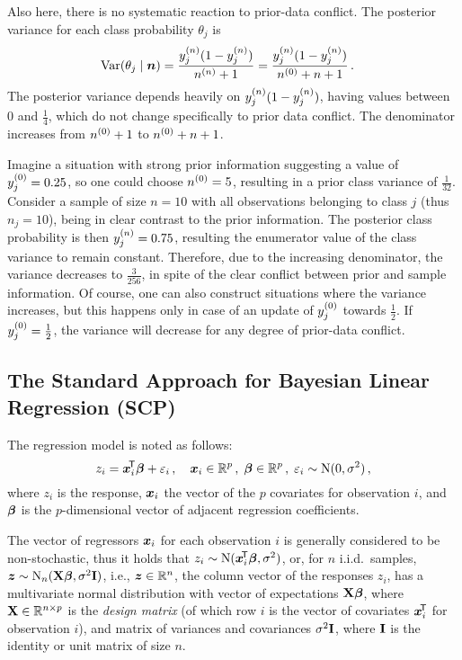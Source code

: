 Also here, there is no systematic reaction to prior-data conflict. The posterior
variance for each class probability $\theta_j$ is %
\begin{align*}
\operatorname{Var}(\theta_j\mid {\bm n}) &= \frac{y^{(n)}_j (1 - y^{(n)}_j)}{n^{(n)}+1}
                          = \frac{y^{(n)}_j (1 - y^{(n)}_j)}{n^{(0)}+n+1}\,.
\end{align*}
The posterior variance depends heavily on $y^{(n)}_j (1 - y^{(n)}_j)$,
having values between $0$ and $\frac{1}{4}$, which do not change
specifically to prior data conflict. The denominator increases from
$n^{(0)}+1$ to $n^{(0)}+n+1$.

Imagine a situation with strong prior information suggesting a value of $y^{(0)}_j = 0.25$,
so one could choose $n^{(0)} = 5$, resulting in a prior class variance of $\frac{1}{32}$.
Consider a sample of size $n=10$ with all observations belonging to class $j$ (thus $n_j=10$),
being in clear contrast to the prior information. The posterior class probability
is then $y^{(n)}_j = 0.75$, resulting the enumerator value of the class variance to remain constant.
Therefore, due to the increasing denominator, the variance decreases to $\frac{3}{256}$,
in spite of the clear conflict between prior and sample information.
Of course, one can also construct situations where the variance increases, but this
happens only in case of an update of $y^{(0)}_j$ towards $\frac{1}{2}$.
If $y^{(0)}_j = \frac{1}{2}$, the variance will decrease for any degree of prior-data conflict.


\subsection{The Standard Approach for Bayesian Linear Regression (SCP)}
\label{sec:scp}

The regression model is noted as follows:
\begin{equation*}
z_i = {\bm x}_i^{{\mbox{\!\scriptsize\textsf{T}}}}\boldsymbol{\beta} + \varepsilon_i \,,\quad {\bm x}_i \in \mathbb{R}^{p} \,,\;
\boldsymbol{\beta} \in \mathbb{R}^p \,,\; \varepsilon_i \sim \operatorname{N}(0,\sigma^2)\,,
\end{equation*}
where $z_i$ is the response, ${\bm x}_i$ the vector of the $p$ covariates for observation $i$,
and $\boldsymbol{\beta}$ is the $p$-dimensional vector of adjacent regression coefficients.

The vector of regressors ${\bm x}_i$ for each observation $i$ is generally
considered to be non-stochastic, thus it holds that $z_i \sim \operatorname{N}({\bm x}_i^{{\mbox{\!\scriptsize\textsf{T}}}}\boldsymbol{\beta},\sigma^2)$,
or, for $n$ i.i.d.\ samples, ${\bm z} \sim \operatorname{N}_n(\mathbf{X}\boldsymbol{\beta},\sigma^2 \mathbf{I})$,
i.e., ${\bm z} \in \mathbb{R}^n$, the column vector of the responses $z_i$,
has a multivariate normal distribution with vector of expectations $\mathbf{X}\boldsymbol{\beta}$,
where $\mathbf{X} \in \mathbb{R}^{n \times p}$ is the \emph{design matrix}
(of which row $i$ is the vector of covariates ${\bm x}_i^{{\mbox{\!\scriptsize\textsf{T}}}}$ for observation $i$),
and matrix of variances and covariances $\sigma^2 \mathbf{I}$,
where $\mathbf{I}$ is the identity or unit matrix of size $n$.%

